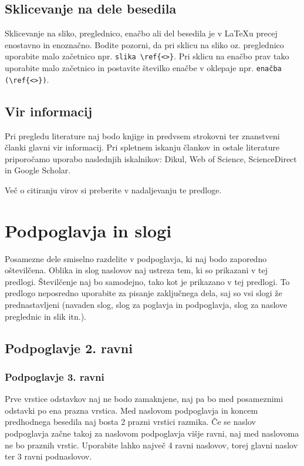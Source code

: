 \subsection{Sklicevanje na dele besedila}\label{sec:sklici}

Sklicevanje na sliko, preglednico, enačbo ali del besedila je v \LaTeX u precej enostavno in enoznačno. Bodite pozorni, da pri sklicu na sliko oz. preglednico uporabite malo začetnico npr. \verb|slika \ref{<>}|. Pri sklicu na enačbo prav tako uporabite malo začetnico in postavite številko enačbe v oklepaje npr. \verb|enačba (\ref{<>})|.


\subsection{Vir informacij}\label{sec:vir_informacij}
Pri pregledu literature naj bodo knjige in predvsem strokovni ter znanstveni članki glavni vir informacij. Pri spletnem iskanju člankov in ostale literature priporočamo uporabo naslednjih iskalnikov: Dikul, Web of Science, ScienceDirect in Google Scholar.

Več o citiranju virov si preberite v nadaljevanju te predloge.

\section{Podpoglavja in slogi}\label{sec:podpoglavja}
Posamezne dele smiselno razdelite v podpoglavja, ki naj bodo zaporedno oštevilčena. Oblika in slog naslovov naj ustreza tem, ki so prikazani v tej predlogi. Številčenje naj bo samodejno, tako kot je prikazano v tej predlogi. To predlogo neposredno uporabite za pisanje zaključnega dela, saj so vsi slogi že prednastavljeni (navaden slog, slog za poglavja in podpoglavja, slog za naslove preglednic in slik itn.).

\subsection{Podpoglavje 2. ravni}\label{sec:poglavje_2}
\subsubsection{Podpoglavje 3. ravni}\label{sec:poglavje_3}

Prve vrstice odstavkov naj ne bodo zamaknjene, naj pa bo med posameznimi odstavki po ena prazna vrstica. Med naslovom podpoglavja in koncem predhodnega besedila naj bosta 2 prazni vrstici razmika. Če se naslov podpoglavja začne takoj za naslovom podpoglavja višje ravni, naj med naslovoma ne bo praznih vrstic. Uporabite lahko največ 4 ravni naslovov, torej glavni naslov ter 3 ravni podnaslovov.

